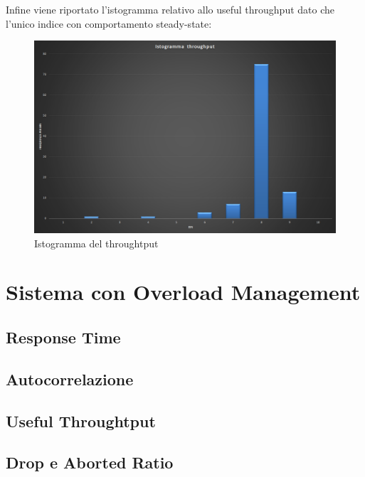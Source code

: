 Infine viene riportato l'istogramma relativo allo useful throughput dato che l'unico
indice con comportamento steady-state:

\begin{figure}[H]
 \centering
 \includegraphics[scale=0.45]{img/istogramma.png}
 \caption[Istogramma del throughtput]{Istogramma del throughtput}
 \label{fig:Istogramma del throughtput}
\end{figure}




\section{Sistema con Overload Management}

\subsection{Response Time}

\subsection{Autocorrelazione}

\subsection{Useful Throughtput}

\subsection{Drop e Aborted Ratio}